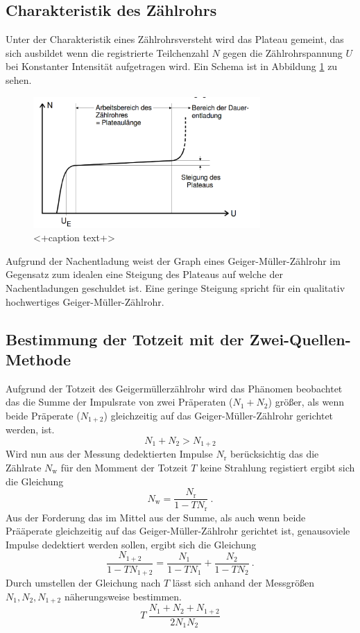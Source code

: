 \subsection{Charakteristik des Zählrohrs}
Unter der Charakteristik eines Zählrohrsversteht wird das Plateau gemeint, das sich ausbildet wenn die registrierte Teilchenzahl $N$ gegen die Zählrohrspannung $U$ bei Konstanter Intensität aufgetragen wird. Ein Schema ist in Abbildung \ref{fig:Pla} zu sehen. 
\begin{figure}
  \centering
  \includegraphics[height=5cm]{picture/Plateau.pdf}
  \caption{<+caption text+>}
  \label{fig:Pla}
\end{figure}
Aufgrund der Nachentladung weist der Graph eines Geiger-Müller-Zählrohr im Gegensatz zum idealen eine Steigung des Plateaus auf welche der Nachentladungen geschuldet ist. Eine geringe Steigung spricht für ein qualitativ hochwertiges Geiger-Müller-Zählrohr.

\subsection{Bestimmung der Totzeit mit der Zwei-Quellen-Methode}
Aufgrund der Totzeit des Geigermüllerzählrohr wird das Phänomen beobachtet das die Summe der Impulsrate von zwei Präperaten ($N_1 + N_2$) größer, als wenn beide Präperate ($N_{1+2}$) gleichzeitig auf das Geiger-Müller-Zählrohr gerichtet werden, ist.
\begin{equation}
  	N_1 + N_2 > N_{1+2}
  \label{eqn:ungl}
\end{equation}
Wird nun aus der Messung dedektierten Impulse $N_\text{r}$ berücksichtig das die Zählrate $N_\text{w}$ für den Momment der Totzeit $T$ keine Strahlung registiert ergibt sich die Gleichung
\begin{equation}
  N_\text{w} = \frac{N_\text{r}}{1 - T N_\text{r} } \ .
  \label{eqn:zaelr}
\end{equation}
Aus der Forderung das im Mittel aus der Summe, als auch wenn beide Prääperate gleichzeitig auf das Geiger-Müller-Zählrohr gerichtet ist, genausoviele Impulse dedektiert werden sollen, ergibt sich die Gleichung
\begin{equation}
  \frac{N_{1+2}}{1-TN_{1+2}} = \frac{N_{1}}{1-TN_{1}} + \frac{N_{2}}{1-TN_{2}} \ .
\end{equation}
Durch umstellen der Gleichung nach $T$ lässt sich anhand der Messgrößen $N_1, N_2, N_{1+2}$ näherungsweise bestimmen.
\begin{equation}
  T ~ \frac{N_1 + N_2 + N_{1+2}}{2 N_1 N_2}
  \label{eqn:T}
\end{equation}
